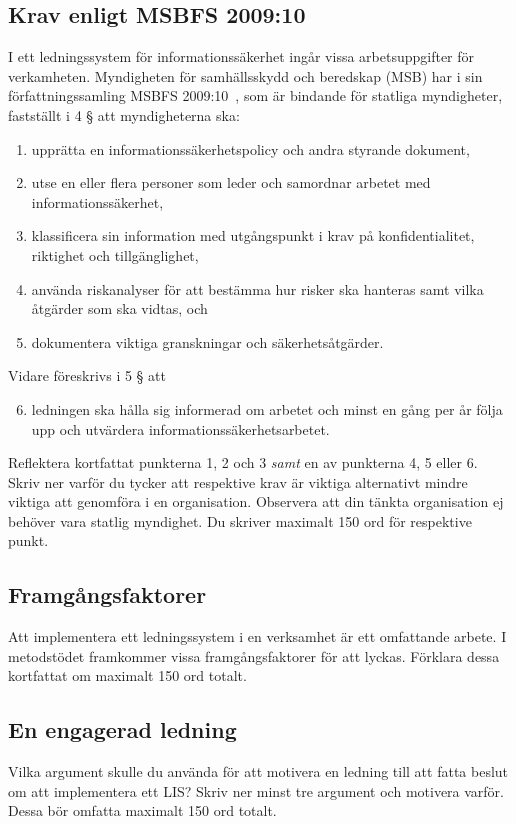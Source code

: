\documentclass[a4paper]{llncs}
\begin{document}
\subsection{Krav enligt MSBFS 2009:10}
\noindent
I ett ledningssystem för informationssäkerhet ingår vissa arbetsuppgifter för 
verkamheten.
Myndigheten för samhällsskydd och beredskap (MSB) har i sin författningssamling 
MSBFS 2009:10~\cite{MSBFS2009:10}, som är bindande för statliga myndigheter, 
fastställt i 4 § att myndigheterna ska:
\begin{enumerate}
  \item upprätta en informationssäkerhetspolicy och andra styrande dokument,
  \item utse en eller flera personer som leder och samordnar arbetet med 
    informationssäkerhet,
  \item klassificera sin information med utgångspunkt i krav på 
    konfidentialitet, riktighet och tillgänglighet,
  \item använda riskanalyser för att bestämma hur risker ska hanteras samt 
    vilka åtgärder som ska vidtas, och
  \item dokumentera viktiga granskningar och säkerhetsåtgärder.
\end{enumerate}
Vidare föreskrivs i 5 § att
\begin{enumerate}\setcounter{enumi}{5}
  \item ledningen ska hålla sig informerad om arbetet och minst en gång per år 
    följa upp och utvärdera informationssäkerhetsarbetet.
\end{enumerate}

Reflektera kortfattat punkterna 1, 2 och 3 \emph{samt} en av punkterna 4, 
5 eller 6.
Skriv ner varför du tycker att respektive krav är viktiga alternativt mindre 
viktiga att genomföra i en organisation.
Observera att din tänkta organisation ej behöver vara statlig myndighet.
Du skriver maximalt 150 ord för respektive punkt.

\subsection{Framgångsfaktorer}
\noindent
Att implementera ett ledningssystem i en verksamhet är ett omfattande arbete.
I metodstödet framkommer vissa framgångsfaktorer för att lyckas.
Förklara dessa kortfattat om maximalt 150 ord totalt.

\subsection{En engagerad ledning}
\noindent
Vilka argument skulle du använda för att motivera en ledning till att fatta 
beslut om att implementera ett LIS\@?
Skriv ner minst tre argument och motivera varför.
Dessa bör omfatta maximalt 150 ord totalt.
\end{document}
